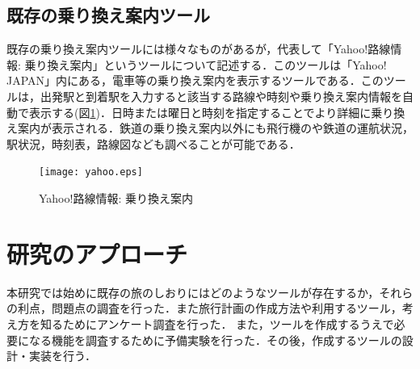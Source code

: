 \documentclass{funthesis}
\begin{document}
\section{既存の乗り換え案内ツール}
既存の乗り換え案内ツールには様々なものがあるが，代表して「Yahoo!路線情報: 乗り換え案内」\cite{yahoo}というツールについて記述する．このツールは「Yahoo! JAPAN」内にある，電車等の乗り換え案内を表示するツールである．このツールは，出発駅と到着駅を入力すると該当する路線や時刻や乗り換え案内情報を自動で表示する(図\ref{Lyahoo})．日時または曜日と時刻を指定することでより詳細に乗り換え案内が表示される．鉄道の乗り換え案内以外にも飛行機のや鉄道の運航状況，駅状況，時刻表，路線図なども調べることが可能である．

\begin{figure}[htpb]
\begin{center}
\texttt{[image: yahoo.eps]}
\end{center}
\caption{Yahoo!路線情報: 乗り換え案内}
\label{Lyahoo}
\end{figure}



\chapter{研究のアプローチ}%

本研究では始めに既存の旅のしおりにはどのようなツールが存在するか，それらの利点，問題点の調査を行った．また旅行計画の作成方法や利用するツール，考え方を知るためにアンケート調査を行った．
また，ツールを作成するうえで必要になる機能を調査するために予備実験を行った．その後，作成するツールの設計・実装を行う．





\end{document}
